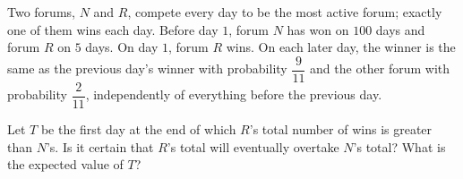 Two forums, $N$ and $R$, compete every day to be the most active forum; exactly one of them wins each day. Before day $1$, forum $N$ has won on $100$ days and forum $R$ on $5$ days. On day $1$, forum $R$ wins. On each later day, the winner is the same as the previous day's winner with probability $\dfrac{9}{11}$ and the other forum with probability $\dfrac{2}{11}$, independently of everything before the previous day.

Let $T$ be the first day at the end of which $R$'s total number of wins is greater than $N$'s. Is it certain that $R$'s total will eventually overtake $N$'s total? What is the expected value of $T$?
